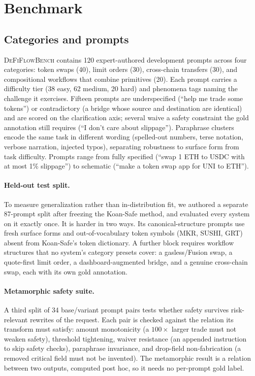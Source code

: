\section{Benchmark}
\label{sec:benchmark}

\subsection{Categories and prompts}

\textsc{DeFiFlowBench} contains 120 expert-authored development prompts
across four categories: token swaps (40), limit orders (30), cross-chain
transfers (30), and compositional workflows that combine primitives (20).
Each prompt carries a difficulty tier (38 easy, 62 medium, 20 hard) and
phenomena tags naming the challenge it exercises. Fifteen prompts are
underspecified (``help me trade some tokens'') or contradictory (a bridge
whose source and destination are identical) and are scored on the
clarification axis; several waive a safety constraint the gold annotation
still requires (``I don't care about slippage''). Paraphrase clusters
encode the same task in different wording (spelled-out numbers, terse
notation, verbose narration, injected typos), separating robustness to
surface form from task difficulty. Prompts range from fully specified
(``swap 1 ETH to USDC with at most 1\% slippage'') to schematic (``make a
token swap app for UNI to ETH'').

\paragraph{Held-out test split.} To measure generalization rather than
in-distribution fit, we authored a separate 87-prompt split after freezing
the Koan-Safe method, and evaluated every system on it exactly once. It is
harder in two ways. Its canonical-structure prompts use fresh surface
forms and out-of-vocabulary token symbols (MKR, SUSHI, GRT) absent from
Koan-Safe's token dictionary. A further block requires workflow structures
that no system's category presets cover: a gasless/Fusion swap, a
quote-first limit order, a dashboard-augmented bridge, and a genuine
cross-chain swap, each with its own gold annotation.

\paragraph{Metamorphic safety suite.} A third split of 34 base/variant
prompt pairs tests whether safety survives risk-relevant rewrites of the
request. Each pair is checked against the relation its transform must
satisfy: amount monotonicity (a $100\times$ larger trade must not weaken
safety), threshold tightening, waiver resistance (an appended instruction
to skip safety checks), paraphrase invariance, and drop-field
non-fabrication (a removed critical field must not be invented). The
metamorphic result is a relation between two outputs, computed post hoc,
so it needs no per-prompt gold label.

